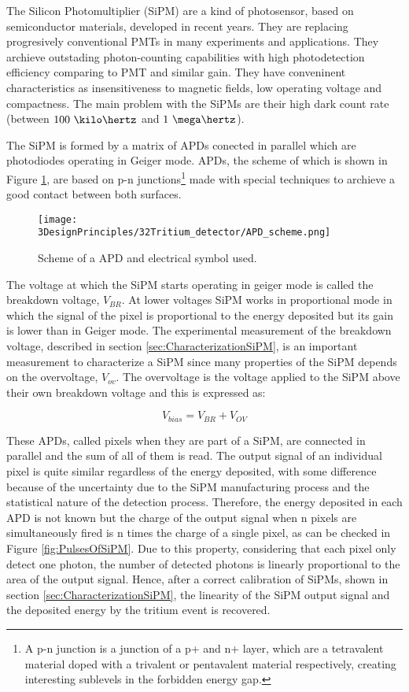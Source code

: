The Silicon Photomultiplier (SiPM) are a kind of photosensor, based on semiconductor materials, developed in recent years. They are replacing progresively conventional PMTs in many experiments and applications. They archieve outstading photon-counting capabilities with high photodetection efficiency comparing to PMT and similar gain. They have conveninent characteristics as insensitiveness to magnetic fields, low operating voltage and compactness. The main problem with the SiPMs are their high dark count rate (between $100~\kilo\hertz$ and $1~\mega\hertz$).

The SiPM is formed by a matrix of APDs conected in parallel which are photodiodes operating in Geiger mode. APDs, the scheme of which is shown in Figure \ref{fig:SchemeAPD}, are based on p-n junctions\footnote{A p-n junction is a junction of a p+ and n+ layer, which are a tetravalent material doped with a trivalent or pentavalent material respectively, creating interesting sublevels in the forbidden energy gap.} made with special techniques to archieve a good contact between both surfaces.

\begin{figure}[htbp]
\centering
\texttt{[image: 3DesignPrinciples/32Tritium\_detector/APD\_scheme.png]}
\caption{Scheme of a APD and electrical symbol used.\label{fig:SchemeAPD}~\cite{OSI}}
\end{figure}
 

The voltage at which the SiPM starts operating in geiger mode is called the breakdown voltage, $V_ {BR}$. At lower voltages SiPM works in proportional mode in which the signal of the pixel is proportional to the energy deposited but its gain is lower than in Geiger mode. The experimental measurement of the breakdown voltage, described in section \ref{sec:CharacterizationSiPM}, is an important measurement to characterize a SiPM since many properties of the SiPM depends on the overvoltage, $V_{ov}$. The overvoltage is the voltage applied to the SiPM above their own breakdown voltage and this is expressed as:

\begin{equation}
V_{bias}=V_{BR}+V_{OV}
\label{overvoltage}
\end{equation}

These APDs, called pixels when they are part of a SiPM, are connected in parallel and the sum of all of them is read. The output signal of an individual pixel is quite similar regardless of the energy deposited, with some difference because of the uncertainty due to the SiPM manufacturing process and the statistical nature of the detection process. Therefore, the energy deposited in each APD is not known but the charge of the output signal when n pixels are simultaneously fired is n times the charge of a single pixel, as can be checked in Figure \ref{fig:PulsesOfSiPM}. Due to this property, considering that each pixel only detect one photon, the number of detected photons is linearly proportional to the area of the output signal. Hence, after a correct calibration of SiPMs, shown in section \ref{sec:CharacterizationSiPM}, the linearity of the SiPM output signal and the deposited energy by the tritium event is recovered.

